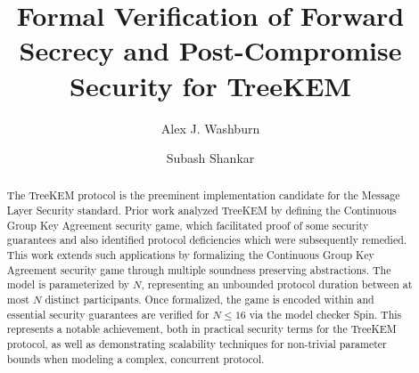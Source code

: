 \documentclass[runningheads]{llncs}
\begin{document}
\title{Formal Verification of Forward Secrecy and Post-Compromise Security for TreeKEM}
%

\author{Alex J. Washburn \and
Subash Shankar}



%

\maketitle              %
%
\begin{abstract}
The TreeKEM protocol is the preeminent implementation candidate for the Message Layer Security standard.
Prior work analyzed TreeKEM by defining the Continuous Group Key Agreement security game,
which facilitated proof of some security guarantees and also identified protocol deficiencies which were subsequently remedied.
This work extends such applications by formalizing the Continuous Group Key Agreement security game through multiple soundness preserving abstractions.
The model is parameterized by $N$, representing an unbounded protocol duration between at most $N$ distinct participants.
Once formalized, the game is encoded within \Promela and essential security guarantees are verified for $N \le 16$ via the model checker Spin.
This represents a notable achievement, both in practical security terms for the TreeKEM protocol, as well as demonstrating scalability techniques for non-trivial parameter bounds when modeling a complex, concurrent protocol.
\end{abstract}
\end{document}
